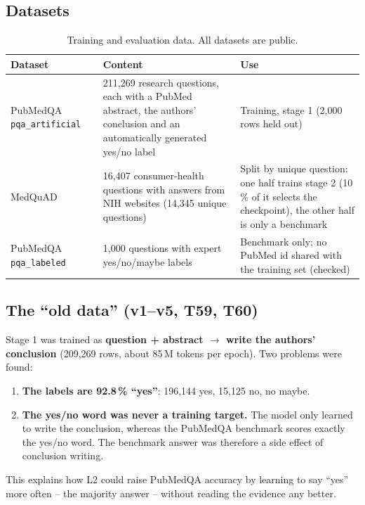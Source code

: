 \documentclass[a4paper,11pt,parskip=half]{scrartcl}
\newcommand{\code}[1]{\texttt{\small #1}}
\begin{document}
\subsection{Datasets}

\begin{table}[H]
\centering\small
\begin{tabularx}{\linewidth}{@{}>{\raggedright\arraybackslash}p{3.1cm}Y>{\raggedright\arraybackslash}p{4.6cm}@{}}
\toprule
Dataset & Content & Use\\
\midrule
PubMedQA \code{pqa\_artificial}~\cite{pubmedqa} & 211{,}269 research questions, each with a PubMed abstract, the authors' conclusion and an automatically generated yes/no label & Training, stage 1 (2{,}000 rows held out)\\
MedQuAD~\cite{medquad} & 16{,}407 consumer-health questions with answers from NIH websites (14{,}345 unique questions) & Split by unique question: one half trains stage 2 (10\,\% of it selects the checkpoint), the other half is only a benchmark\\
PubMedQA \code{pqa\_labeled}~\cite{pubmedqa} & 1{,}000 questions with expert yes/no/maybe labels & Benchmark only; no PubMed id shared with the training set (checked)\\
\bottomrule
\end{tabularx}
\caption{Training and evaluation data. All datasets are public.}
\end{table}

\subsection{The ``old data'' (v1--v5, T59, T60)}

Stage 1 was trained as \textbf{question + abstract $\rightarrow$ write the authors' conclusion} (209{,}269 rows, about 85\,M tokens per epoch). Two problems were found:
\begin{enumerate}
  \item \textbf{The labels are 92.8\,\% ``yes''}: 196{,}144 yes, 15{,}125 no, no maybe.
  \item \textbf{The yes/no word was never a training target.} The model only learned to write the conclusion, whereas the PubMedQA benchmark scores exactly the yes/no word. The benchmark answer was therefore a side effect of conclusion writing.
\end{enumerate}
This explains how L2 could raise PubMedQA accuracy by learning to say ``yes'' more often -- the majority answer -- without reading the evidence any better.
\end{document}
